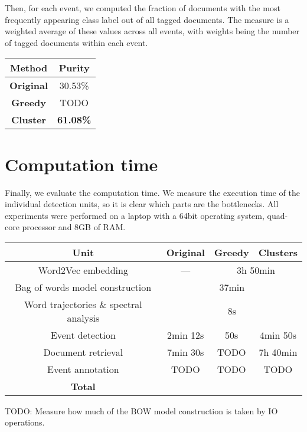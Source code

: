 Then, for each event, we computed the fraction of documents with the most frequently appearing class label out of all tagged documents. The measure is a weighted average of these values across all events, with weights being the number of tagged documents within each event.

\hspace{\fill}

\begin{minipage}{\linewidth}
\centering
\begin{tabular}{ c c }\toprule[1.5pt]
\bf Method 	 & \bf Purity \\ \midrule
\bf Original &  30.53\% \\
\bf Greedy   &  {\color{red} TODO} \\
\bf Cluster &  \bf 61.08\% \\ \bottomrule[1.25pt]
\end {tabular}\par
{} \label{tab:title} 
\end{minipage}

\hspace{\fill}

\section{Computation time}

Finally, we evaluate the computation time. We measure the execution time of the individual detection units, so it is clear which parts are the bottlenecks. All experiments were performed on a laptop with a 64bit operating system, quad-core processor and 8GB of RAM.

\hspace{\fill}

\begin{minipage}{\linewidth}
\centering
\begin{tabular}{ c c c c }\toprule[1.5pt]
\bf Unit & \bf Original & \bf Greedy & \bf Clusters \\ \midrule
Word2Vec embedding & --- & \multicolumn{2}{c}{3h 50min} \\
Bag of words model construction & \multicolumn{3}{c}{37min} \\
Word trajectories \& spectral analysis & \multicolumn{3}{c}{8s} \\
Event detection & 2min 12s & 50s & 4min 50s \\
Document retrieval & 7min 30s & {\color{red} TODO} & 7h 40min \\
Event annotation & {\color{red} TODO} & {\color{red} TODO} & {\color{red} TODO} \\ \midrule
\bf Total & & & \\ \bottomrule[1.25pt]

\end{tabular}\par
{} \label{tab:title}
\end{minipage}

\hspace{\fill}

{\color{red} TODO: Measure how much of the BOW model construction is taken by IO operations.}

